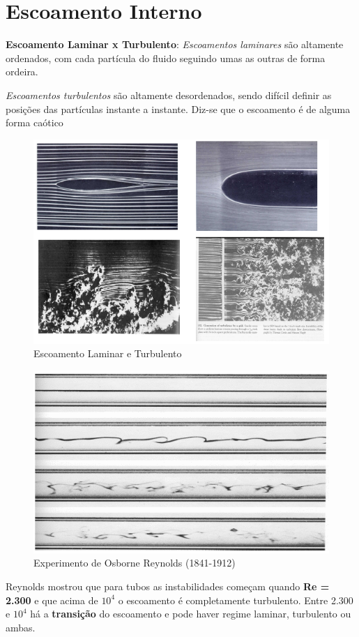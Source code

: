 \documentclass[a4paper, 12pt]{article}
\begin{document}
\section{Escoamento Interno}
	\textbf{Escoamento Laminar x Turbulento}: \textit{Escoamentos laminares} são altamente ordenados, com cada partícula do fluido seguindo umas as outras de forma ordeira.
	
	\textit{Escoamentos turbulentos} são altamente desordenados, sendo difícil definir as posições das partículas instante a instante. Diz-se que o escoamento é de alguma forma caótico
	\begin{figure}[h]
		\centering
		\includegraphics[width=0.7\linewidth]{imagens/escoamento}
		\caption{Escoamento Laminar e Turbulento}
		\label{fig:escoamento}
	\end{figure}
	\begin{figure}[h]
		\centering
		\includegraphics[width=0.7\linewidth]{imagens/escoamento1}
		\caption{Experimento de Osborne Reynolds (1841-1912)}
		\label{fig:escoamento1}
	\end{figure}

	Reynolds mostrou que para tubos as instabilidades começam quando \textbf{Re = 2.300} e que acima de \textbf{$10^4$} o escoamento é completamente turbulento.
	Entre 2.300 e $10^4$ há a \textbf{transição} do escoamento e pode haver regime laminar, turbulento ou ambas.\\
	
\end{document}
